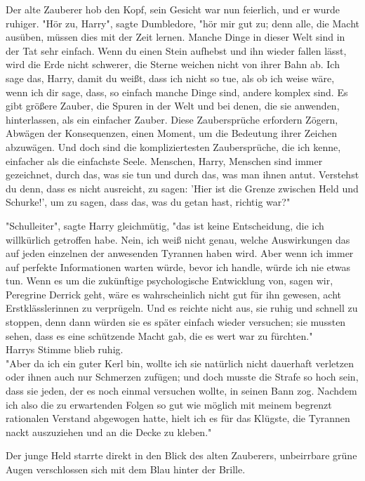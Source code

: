 {Der alte Zauberer hob den Kopf, sein Gesicht war nun feierlich, und er wurde ruhiger. "Hör zu, Harry", sagte Dumbledore, "hör mir gut zu; denn alle, die Macht ausüben, müssen dies mit der Zeit lernen. Manche Dinge in dieser Welt sind in der Tat sehr einfach. Wenn du einen Stein aufhebst und ihn wieder fallen lässt, wird die Erde nicht schwerer, die Sterne weichen nicht von ihrer Bahn ab. Ich sage das, Harry, damit du weißt, dass ich nicht so tue, als ob ich weise wäre, wenn ich dir sage, dass, so einfach manche Dinge sind, andere komplex sind. Es gibt größere Zauber, die Spuren in der Welt und bei denen, die sie anwenden, hinterlassen, als ein einfacher Zauber. Diese Zaubersprüche erfordern Zögern, Abwägen der Konsequenzen, einen Moment, um die Bedeutung ihrer Zeichen abzuwägen. Und doch sind die kompliziertesten Zaubersprüche, die ich kenne, einfacher als die einfachste Seele. Menschen, Harry, Menschen sind immer gezeichnet, durch das, was sie tun und durch das, was man ihnen antut. Verstehst du denn, dass es nicht ausreicht, zu sagen: 'Hier ist die Grenze zwischen Held und Schurke!', um zu sagen, dass das, was du getan hast, richtig war?"

"Schulleiter", sagte Harry gleichmütig, "das ist keine Entscheidung, die ich willkürlich getroffen habe. Nein, ich weiß nicht genau, welche Auswirkungen das auf jeden einzelnen der anwesenden Tyrannen haben wird. Aber wenn ich immer auf perfekte Informationen warten würde, bevor ich handle, würde ich nie etwas tun. Wenn es um die zukünftige psychologische Entwicklung von, sagen wir, Peregrine Derrick geht, wäre es wahrscheinlich nicht gut für ihn gewesen, acht Erstklässlerinnen zu verprügeln. Und es reichte nicht aus, sie ruhig und schnell zu stoppen, denn dann würden sie es später einfach wieder versuchen; sie mussten sehen, dass es eine schützende Macht gab, die es wert war zu fürchten."\\ Harrys Stimme blieb ruhig.\\ "Aber da ich ein guter Kerl bin, wollte ich sie natürlich nicht dauerhaft verletzen oder ihnen auch nur Schmerzen zufügen; und doch musste die Strafe so hoch sein, dass sie jeden, der es noch einmal versuchen wollte, in seinen Bann zog. Nachdem ich also die zu erwartenden Folgen so gut wie möglich mit meinem begrenzt rationalen Verstand abgewogen hatte, hielt ich es für das Klügste, die Tyrannen nackt auszuziehen und an die Decke zu kleben."

Der junge Held starrte direkt in den Blick des alten Zauberers, unbeirrbare grüne Augen verschlossen sich mit dem Blau hinter der Brille.

}
